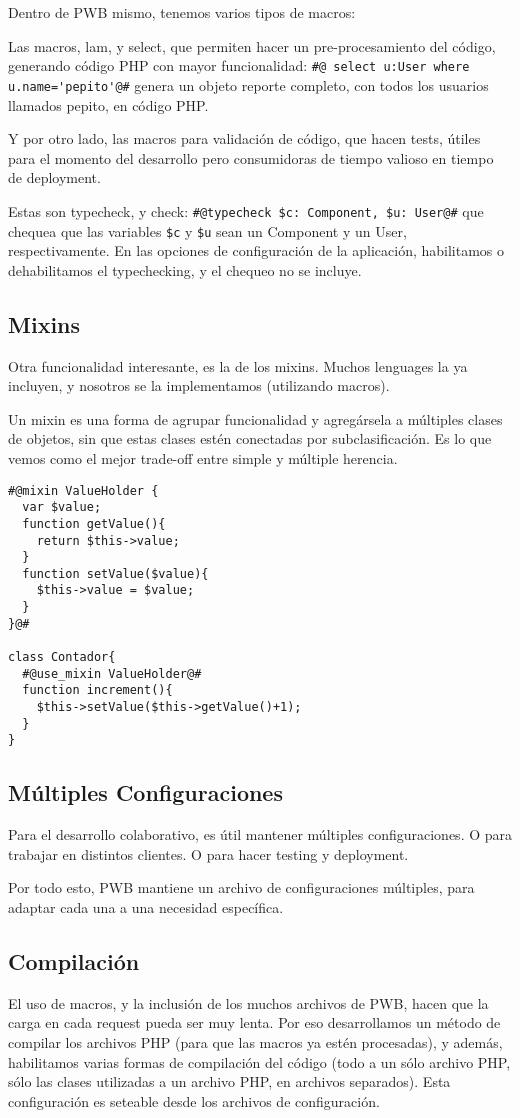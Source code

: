 Dentro de PWB mismo, tenemos varios tipos de macros:

Las macros, lam, y select, que permiten hacer un pre-procesamiento del código, generando código PHP con
mayor funcionalidad:
\verb"#@ select u:User where u.name='pepito'@#"
genera un objeto reporte completo, con todos los usuarios llamados pepito, en código PHP.

Y por otro lado, las macros para validación de código, que hacen tests, útiles para el momento del desarrollo
pero consumidoras de tiempo valioso en tiempo de deployment.

Estas son typecheck, y check:
\verb"#@typecheck $c: Component, $u: User@#"
que chequea que las variables \verb"$c" y \verb"$u" sean un Component y un User, respectivamente. En las opciones de
configuración de la aplicación, habilitamos o dehabilitamos el typechecking, y el chequeo no se incluye.

\subsection{Mixins}
\label{sub-mixins}
Otra funcionalidad interesante, es la de los mixins. Muchos lenguages la ya incluyen, y nosotros se la
implementamos (utilizando macros).

Un mixin es una forma de agrupar funcionalidad y agregársela a múltiples clases de objetos, sin que estas
clases estén conectadas por subclasificación. Es lo que vemos como el mejor trade-off entre simple y múltiple
herencia.
\begin{verbatim}
#@mixin ValueHolder {
  var $value;
  function getValue(){
    return $this->value;
  }
  function setValue($value){
    $this->value = $value;
  }
}@#

class Contador{
  #@use_mixin ValueHolder@#
  function increment(){
    $this->setValue($this->getValue()+1);
  }
}
\end{verbatim}
\subsection{Múltiples Configuraciones}

Para el desarrollo colaborativo, es útil mantener múltiples configuraciones. O para trabajar en distintos
clientes. O para hacer testing y deployment.

Por todo esto, PWB mantiene un archivo de configuraciones múltiples, para adaptar cada una a una necesidad
específica.

\subsection{Compilación}

El uso de macros, y la inclusión de los muchos archivos de PWB, hacen que la carga en cada request pueda ser
muy lenta. Por eso desarrollamos un método de compilar los archivos PHP (para que las macros ya estén procesadas),
y además, habilitamos varias formas de compilación del código (todo a un sólo archivo PHP, sólo las clases
utilizadas a un archivo PHP, en archivos separados). Esta configuración es seteable desde los archivos de
configuración.


